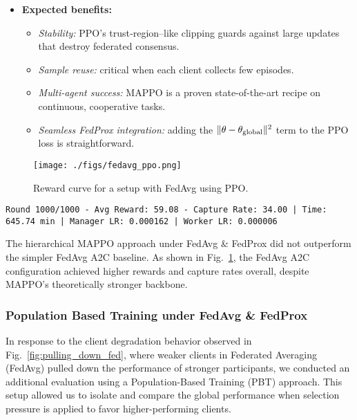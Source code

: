 \documentclass[12pt,a4paper,twoside,openany]{book}
\begin{document}
\begin{itemize}
  \item \textbf{Expected benefits:}
    \begin{itemize}
      \item \emph{Stability:} PPO’s trust‐region–like clipping guards against large updates that destroy federated consensus.
      \item \emph{Sample reuse:} critical when each client collects few episodes.
      \item \emph{Multi-agent success:} MAPPO is a proven state-of-the-art recipe on continuous, cooperative tasks.
      \item \emph{Seamless FedProx integration:} adding the $\|\theta-\theta_{\rm global}\|^2$ term to the PPO loss is straightforward.
    \end{itemize}
\end{itemize}

\begin{figure}[H]
\centering
\texttt{[image: ./figs/fedavg\_ppo.png]}
\captionsetup{font=small}
\caption{Reward curve for a setup with FedAvg using PPO.}
\label{fig:fedavg_ppo}
\end{figure}

\begin{lstlisting}
Round 1000/1000 - Avg Reward: 59.08 - Capture Rate: 34.00 | Time: 645.74 min | Manager LR: 0.000162 | Worker LR: 0.000006
\end{lstlisting}

The hierarchical MAPPO approach under FedAvg \& FedProx did not outperform the simpler FedAvg A2C baseline. As shown in Fig.~\ref{fig:fedavg_ppo}, the FedAvg A2C configuration achieved higher rewards and capture rates overall, despite MAPPO’s theoretically stronger backbone.

\subsubsection{Population Based Training under FedAvg \& FedProx}

In response to the client degradation behavior observed in Fig.~\ref{fig:pulling_down_fed}, where weaker clients in Federated Averaging (FedAvg) pulled down the performance of stronger participants, we conducted an additional evaluation using a Population-Based Training (PBT) approach. This setup allowed us to isolate and compare the global performance when selection pressure is applied to favor higher-performing clients.
\end{document}
